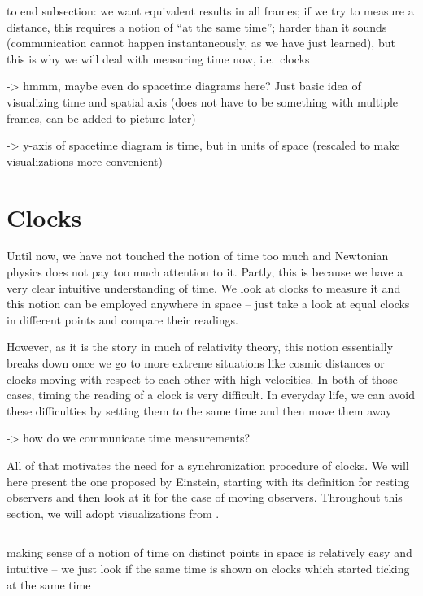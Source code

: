 to end subsection: we want equivalent results in all frames; if we try to measure a distance, this requires a notion of \enquote{at the same time}; harder than it sounds (communication cannot happen instantaneously, as we have just learned), but this is why we will deal with measuring time now, i.e.~clocks



-> hmmm, maybe even do spacetime diagrams here? Just basic idea of visualizing time and spatial axis (does not have to be something with multiple frames, can be added to picture later)

-> y-axis of spacetime diagram is time, but in units of space (rescaled to make visualizations more convenient)



\newpage



	\section{Clocks}%
Until now, we have not touched the notion of time too much and Newtonian physics does not pay too much attention to it. Partly, this is because we have a very clear intuitive understanding of time. We look at clocks to measure it and this notion can be employed anywhere in space -- just take a look at equal clocks in different points and compare their readings.


However, as it is the story in much of relativity theory, this notion essentially breaks down once we go to more extreme situations like cosmic distances or clocks moving with respect to each other with high velocities. In both of those cases, timing the reading of a clock is very difficult. In everyday life, we can avoid these difficulties by setting them to the same time and then move them away

-> how do we communicate time measurements?


All of that motivates the need for a synchronization procedure of clocks. We will here present the one proposed by Einstein, starting with its definition for resting observers and then look at it for the case of moving observers. Throughout this section, we will adopt visualizations from \cite{dragon_geometry_srt}.

\hrule


making sense of a notion of time on distinct points in space is relatively easy and intuitive -- we just look if the same time is shown on clocks which started ticking at the same time

